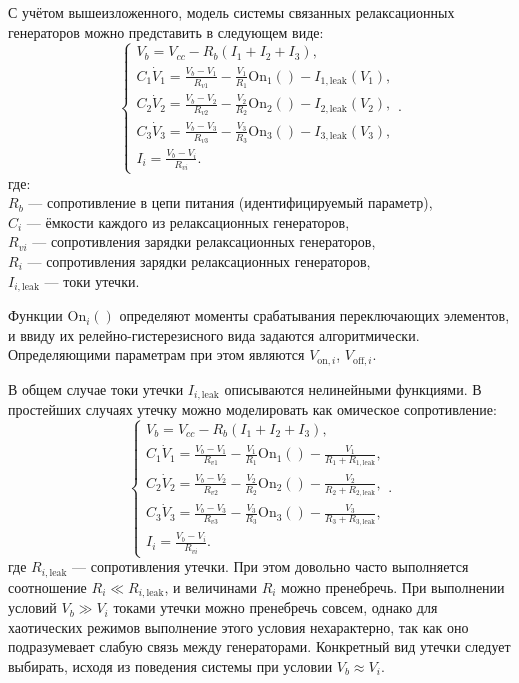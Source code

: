 С учётом вышеизложенного, модель системы связанных релаксационных генераторов
можно представить в следующем виде:
%
\begin{equation}
  \begin{cases}
    V_b = V_{cc} - R_b ( I_1 + I_2 + I_3 ), \\
      C_1 \dot{V}_1 = \frac{V_b-V_1}{R_{v1}} - \frac{V_1}{R_1} \mathrm{On}_1() - I_{1,\mathrm{leak}}(V_1), \\
      C_2 \dot{V}_2 = \frac{V_b-V_2}{R_{v2}} - \frac{V_2}{R_2} \mathrm{On}_2() - I_{2,\mathrm{leak}}(V_2), \\
      C_3 \dot{V}_3 = \frac{V_b-V_3}{R_{v3}} - \frac{V_3}{R_3} \mathrm{On}_3() - I_{3,\mathrm{leak}}(V_3), \\
      I_i = \frac{V_b-V_i}{R_{vi}}.
  \end{cases}.
    \label{atu:eq:relax3}
\end{equation}
%
где: \\
$R_b$ --- сопротивление в цепи питания (идентифицируемый параметр), \\
$C_i$ --- ёмкости каждого из релаксационных генераторов, \\
$R_{vi}$ --- сопротивления зарядки релаксационных генераторов, \\
$R_{i}$ --- сопротивления зарядки релаксационных генераторов, \\
$I_{i,\mathrm{leak}}$ --- токи утечки.

Функции $ \mathrm{On}_i() $ определяют моменты срабатывания переключающих элементов,
и ввиду их релейно-гистерезисного вида
задаются алгоритмически. Определяющими параметрам при этом являются
$V_{\mathrm{on},i}$, $V_{\mathrm{off},i}$.

В общем случае токи утечки $I_{i,\mathrm{leak}}$ описываются нелинейными функциями.
В простейших случаях утечку можно моделировать как омическое сопротивление:
%
\begin{equation}
  \begin{cases}
    V_b = V_{cc} - R_b ( I_1 + I_2 + I_3 ), \\
      C_1 \dot{V}_1 = \frac{V_b-V_1}{R_{v1}} - \frac{V_1}{R_1} \mathrm{On}_1() - \frac{V_1}{R_1+R_{1,\mathrm{leak}}}, \\
      C_2 \dot{V}_2 = \frac{V_b-V_2}{R_{v2}} - \frac{V_2}{R_2} \mathrm{On}_2() - \frac{V_2}{R_2+R_{2,\mathrm{leak}}}, \\
      C_3 \dot{V}_3 = \frac{V_b-V_3}{R_{v3}} - \frac{V_3}{R_3} \mathrm{On}_3() - \frac{V_3}{R_3+R_{3,\mathrm{leak}}}, \\
      I_i = \frac{V_b-V_i}{R_{vi}}.
  \end{cases}.
    \label{atu:eq:relax3_linleak}
\end{equation}
%
где
$R_{i,\mathrm{leak}}$ --- сопротивления утечки.
При этом довольно часто выполняется соотношение
$R_{i} \ll R_{i,\mathrm{leak}} $, и величинами
$R_{i}$ можно пренебречь. При выполнении условий
$V_b \gg V_i$ токами утечки можно пренебречь совсем,
однако для хаотических режимов выполнение этого условия нехарактерно,
так как оно подразумевает слабую связь между генераторами.
Конкретный вид утечки следует выбирать, исходя из поведения системы
при условии $V_b \approx V_i$.


